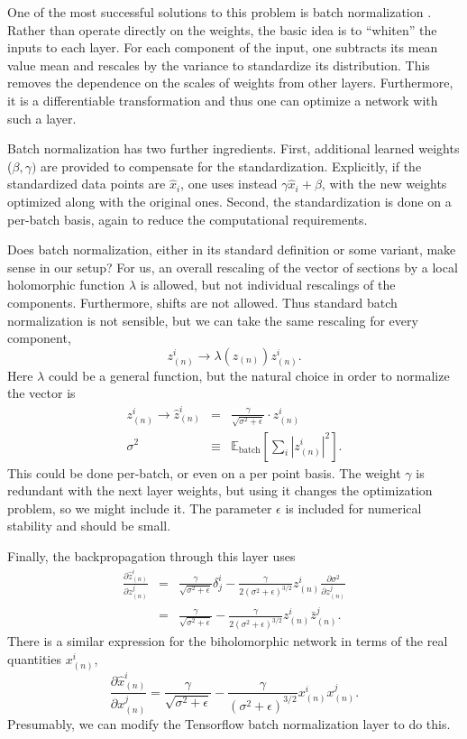 \documentclass[12pt]{article}
\def\E#1#2{\mathbb{E}_{#1}\left[#2\right]}
\newcommand{\be}{\begin{equation}}
\newcommand{\ee}{\end{equation}}
\newcommand{\bea}{\begin{eqnarray}}
\newcommand{\eea}{\end{eqnarray}}
\def\bz{\bar{z}}
\def\bz{\bar{z}}
\begin{document}
One of the most successful solutions to this problem is batch normalization \cite{Ioffe2015}.
Rather than operate directly on the weights, the basic idea is to ``whiten'' the inputs to each layer.
For each component of the input, one subtracts its mean value
mean and rescales by the variance to standardize its distribution.  This removes the dependence on
the scales of weights from other layers.  Furthermore, it
is a differentiable transformation
and thus one can optimize a network with such a layer.   

Batch normalization has two further ingredients.
First, additional learned weights ($\beta,\gamma)$
are provided to compensate for the standardization.  Explicitly, if the
standardized data points are $\hat x_i$, one uses instead $\gamma\hat x_i+\beta$, with the new weights
optimized along with the original ones.
Second, the standardization is done on a per-batch basis, again to reduce the computational requirements.

Does batch normalization, either in its standard definition or some variant, make sense in our setup?
For us, an overall rescaling of the vector of sections by a local holomorphic function $\lambda$ is allowed,
but not individual rescalings of the components.  Furthermore, shifts are not allowed.
Thus standard batch normalization is not sensible, but we can take the same rescaling for every component,
\be
z_{(n)}^i \rightarrow \lambda(z_{(n)}) z_{(n)}^i .
\ee 
Here $\lambda$ could be a general function, but the natural choice in order to normalize the vector is
\bea
z_{(n)}^i \rightarrow \hat z_{(n)}^i &=& \frac{\gamma}{\sqrt{\sigma^2+ \epsilon}} \cdot z_{(n)}^i \\
\sigma^2 &\equiv & \E{\mbox{batch}}{\sum_i |z_{(n)}^i|^2 }.
\eea
This could be done per-batch, or even on a per point basis.  
The weight $\gamma$ is redundant with the next layer weights, but
using it changes the optimization problem, so we might include it.
The parameter $\epsilon$ is included for numerical stability and should be small.

Finally, the backpropagation through this layer uses
\bea
\frac{ \partial \hat z_{(n)}^i }{ \partial z_{(n)}^j } &=& \frac{\gamma}{\sqrt{\sigma^2+ \epsilon}} \delta^i_j -
\frac{\gamma}{2(\sigma^2+ \epsilon)^{3/2}} z_{(n)}^i  \frac{ \partial \sigma^2 }{ \partial z_{(n)}^j } \\
&=& \frac{\gamma}{\sqrt{\sigma^2+ \epsilon}} - \frac{\gamma}{2(\sigma^2+ \epsilon)^{3/2}} z_{(n)}^i \bz_{(n)}^j .
\eea
There is a similar expression for the biholomorphic network in terms of the real quantities $x_{(n)}^i$,
\be
\frac{ \partial \hat x_{(n)}^i }{ \partial x_{(n)}^j } =
\frac{\gamma}{\sqrt{\sigma^2+ \epsilon}} - \frac{\gamma}{(\sigma^2+ \epsilon)^{3/2}} x_{(n)}^i x_{(n)}^j .
\ee
Presumably, we can modify the Tensorflow batch normalization layer to do this.
\end{document}

